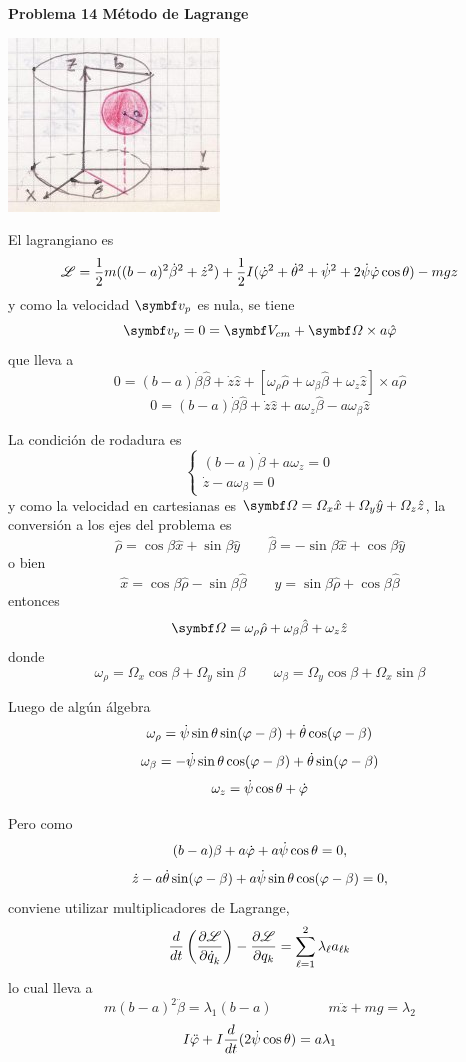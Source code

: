 \documentclass[10pt,oneside]{CBFT_book}
\begin{document}
\begin{ejemplo}{\bf Problema 14 Método de Lagrange}

\includegraphics[scale=0.5]{images/fig_mc_lagrangebola_1.jpg}

El lagrangiano es
\[
	\mathscr{L} = \frac 1 2 m ( (b-a)^2 \dot{\beta}^2 + \dot{z}^2 ) + 
	\frac 1 2 I ( \dot{\varphi}^2 + \dot{\theta}^2 + \dot{\psi}^2 + 2 \dot{\psi} \dot{\varphi} \cos\theta ) 
	- m g z
\]
y como la velocidad $ \vb{v}_p $ es nula, se tiene 
\[
	\vb{v}_p = 0 = \vb{V}_{cm} + \vb{\Omega} \times a \hat{\vp}
\]
que lleva a
\[
	0 = (b-a)\dot{\beta}\hat{\beta} + \dot{z}\hat{z} +
	[\omega_\rho\hat{\rho} + \omega_\beta\hat{\beta} + \omega_z\hat{z} ]\times a\hat{\rho}
\]
\[
	0 = (b-a)\dot{\beta}\hat{\beta} + \dot{z}\hat{z} + a\omega_z\hat{\beta} - a\omega_\beta\hat{z} 
\]

La condición de rodadura es
\[
	\begin{cases}
	 (b-a)\dot{\beta} + a \omega_z = 0 \\
	 \dot{z} - a \omega_\beta = 0
	\end{cases}
\]
y como la velocidad en cartesianas es $ \vb{\Omega} = \Omega_x \hat{x} + \Omega_y \hat{y} + \Omega_z \hat{z} $,
la conversión a los ejes del problema es
\[
	\hat{\rho} = \cos \beta \hat{x} + \sin \beta \hat{y} \qquad 
	\hat{\beta} = -\sin \beta \hat{x} + \cos \beta \hat{y}
\]
o bien
\[
	\hat{x} = \cos \beta \hat{\rho} - \sin \beta \hat{\beta} \qquad 
	\hat{y} = \sin \beta \hat{\rho} + \cos \beta \hat{\beta}
\]
entonces
\[
	\vb{\Omega} = \omega_\rho \hat{\rho} + \omega_\beta \hat{\beta} + \omega_z \hat{z}
\]
donde 
\[
	\omega_\rho = \Omega_x \cos\beta + \Omega_y \sin\beta \qquad 
	\omega_\beta = \Omega_y \cos\beta + \Omega_x \sin\beta 
\]

Luego de algún álgebra
\[
	\omega_\rho = \dot{\psi} \sin\theta \sin(\varphi-\beta) + \dot{\theta} \cos(\varphi-\beta)
\]
\[
	\omega_\beta = -\dot{\psi} \sin\theta \cos(\varphi-\beta) + \dot{\theta} \sin(\varphi-\beta)
\]
\[
	\omega_z = \dot{\psi} \cos\theta + \dot{\varphi}
\]

Pero como
\[
	(b-a) \beta + a \dot{\varphi} + a \dot{\psi} \cos\theta = 0 ,
\]
\[
	\dot{z} -a \dot{\theta} \sin(\varphi-\beta) + a\dot{\psi}\sin\theta\cos(\varphi -\beta) = 0,
\]
conviene utilizar multiplicadores de Lagrange,
\[
	\frac{d^{\hspace{-0.05em}} {}}{d {t}^{\hspace{-0.05em}}}\left( \frac{\partial^{\hspace{-0.05em}} {\mathscr{L}}}{\partial {\dot{q}_k}^{\hspace{-0.05em}}} \right) - \frac{\partial^{\hspace{-0.05em}} {\mathscr{L}}}{\partial {q_k}^{\hspace{-0.05em}}} = \sum_{\ell=1}^2 \lambda_\ell a_{\ell k}
\]
lo cual lleva a 
\[
	m(b-a)^2 \ddot{\beta} = \lambda_1 (b-a) \qquad \qquad 
	m \ddot{z} + m g = \lambda_2
\]
\[
	I \ddot{\varphi} + I \frac{d^{\hspace{-0.05em}} {}}{d {t}^{\hspace{-0.05em}}}( 2 \dot{\psi} \cos\theta ) = a \lambda_1
\]


\end{ejemplo}
\end{document}

